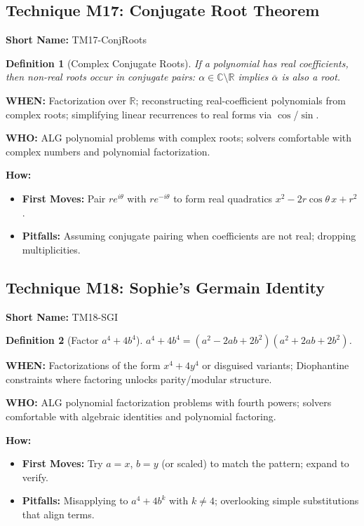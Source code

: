 \documentclass[12pt]{article}
\newtheorem{definition}{Definition}[section]
\begin{document}
\subsection{Technique M17: Conjugate Root Theorem}
\textbf{Short Name:} TM17-ConjRoots

\begin{definition}[Complex Conjugate Roots]
If a polynomial has real coefficients, then non-real roots occur in conjugate pairs: $\alpha\in\mathbb{C}\setminus\mathbb{R}$ implies $\overline{\alpha}$ is also a root.
\end{definition}

\textbf{WHEN:} Factorization over $\mathbb{R}$; reconstructing real-coefficient polynomials from complex roots; simplifying linear recurrences to real forms via $\cos$/$\sin$.

\textbf{WHO:} ALG polynomial problems with complex roots; solvers comfortable with complex numbers and polynomial factorization.

\textbf{How:}
\begin{itemize}
    \item \textbf{First Moves:} Pair $re^{i\theta}$ with $re^{-i\theta}$ to form real quadratics $x^2-2r\cos\theta\,x+r^2$.
    \item \textbf{Pitfalls:} Assuming conjugate pairing when coefficients are not real; dropping multiplicities.
\end{itemize}

\subsection{Technique M18: Sophie's Germain Identity}
\textbf{Short Name:} TM18-SGI

\begin{definition}[Factor $a^4+4b^4$]
$a^4+4b^4=(a^2-2ab+2b^2)(a^2+2ab+2b^2)$.
\end{definition}

\textbf{WHEN:} Factorizations of the form $x^4+4y^4$ or disguised variants; Diophantine constraints where factoring unlocks parity/modular structure.

\textbf{WHO:} ALG polynomial factorization problems with fourth powers; solvers comfortable with algebraic identities and polynomial factoring.

\textbf{How:}
\begin{itemize}
    \item \textbf{First Moves:} Try $a=x$, $b=y$ (or scaled) to match the pattern; expand to verify.
    \item \textbf{Pitfalls:} Misapplying to $a^4+4b^k$ with $k\neq 4$; overlooking simple substitutions that align terms.
\end{itemize}
\end{document}
